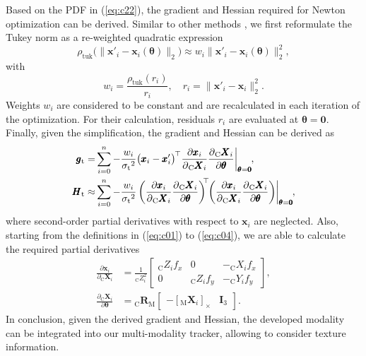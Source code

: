 \documentclass[letterpaper, 10 pt, conference]{ieeeconf}
\begin{document}
Based on the \ac{PDF} in (\ref{eq:c22}), the gradient and Hessian required for Newton optimization can be derived.
Similar to other methods \cite{Lepetit2005}, we first reformulate the Tukey norm as a re-weighted quadratic expression
\begin{equation}\label{eq:c25}
	\rho_\textrm{tuk}\big(\big\lVert\pmb{x}'_i - \pmb{x}_i(\pmb{\theta})\big\rVert_2\big) \approx w_i \big\lVert\pmb{x}'_i - \pmb{x}_i(\pmb{\theta})\big\rVert_2^2,
\end{equation}
with
\begin{equation}\label{eq:c26}
	w_i = \frac{\rho_\textrm{tuk}(r_i)}{r_i}, \quad r_i = \big\lVert\pmb{x}'_i - \pmb{x}_i\big\rVert_2^2.
\end{equation}
Weights $w_i$ are considered to be constant and are recalculated in each iteration of the optimization.
For their calculation, residuals $r_i$ are evaluated at $\pmb{\theta} = \pmb{0}$.
Finally, given the simplification, the gradient and Hessian can be derived as
\begin{align}\label{eq:c27}
	\pmb{g}_\textrm{t} =& \sum_{i=0}^{n} -\frac{w_i}{{\sigma_\textrm{t}}^2}
	\big(\pmb{x}_i - \pmb{x}'_i\big)^{\hspace{-1pt}\top}
	\frac{\partial \pmb{x}_i}{\partial {}_\textrm{C}\pmb{X}_i}
	\frac{\partial {}_\textrm{C}\pmb{X}_i}{\partial \pmb{\theta}}
	\bigg\vert_{\pmb{\theta}=\pmb{0}}\hspace{-1pt},\\\label{eq:c28}
	\pmb{H}_\textrm{t} \approx& \sum_{i=0}^{n} -\frac{w_i}{{\sigma_\textrm{t}}^2}
	\left(\frac{\partial \pmb{x}_i}{\partial {}_\textrm{C}\pmb{X}_i}
	\frac{\partial {}_\textrm{C}\pmb{X}_i}{\partial \pmb{\theta}}\right)^{\hspace{-3pt}\top}\hspace{-3pt}
	\left(\frac{\partial \pmb{x}_i}{\partial {}_\textrm{C}\pmb{X}_i}
	\frac{\partial {}_\textrm{C}\pmb{X}_i}{\partial \pmb{\theta}}\right)
	\hspace{-2pt}\bigg\vert_{\pmb{\theta}=\pmb{0}}\hspace{-1pt},
\end{align}
where second-order partial derivatives with respect to $\pmb{x}_i$ are neglected.
Also, starting from the definitions in (\ref{eq:c01}) to (\ref{eq:c04}), we are able to calculate the required partial derivatives
\begin{align}
	\frac{\partial \pmb{x}_i}{\partial {}_\textrm{C}\pmb{X}_i} &= \frac{1}{{}_\textrm{C}Z_i^2} \begin{bmatrix}
		{}_\textrm{C}Z_i f_x & 0 & -{}_\textrm{C}X_i f_x \\
		0 & {}_\textrm{C}Z_i f_y & -{}_\textrm{C}Y_i f_y
	\end{bmatrix},\\
	\frac{\partial {}_\textrm{C}\pmb{X}_i}{\partial \pmb{\theta}} &= 
	{}_\textrm{C}\pmb{R}_\textrm{M}
	\begin{bmatrix} -[_\textrm{M}\pmb{X}_i]_\times & \pmb{I}_3\end{bmatrix}.
\end{align}
In conclusion, given the derived gradient and Hessian, the developed modality can be integrated into our multi-modality tracker, allowing to consider texture information.
\end{document}
